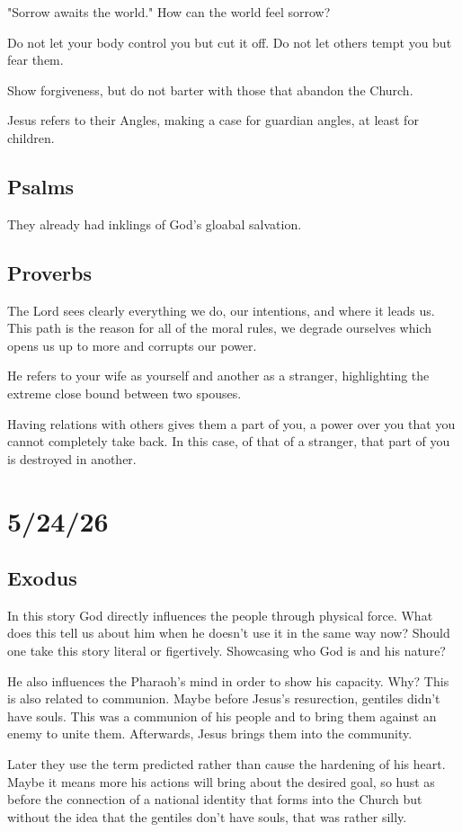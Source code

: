 "Sorrow awaits the world." How can the world feel sorrow?

Do not let your body control you but cut it off. Do not let others tempt you but fear them.

Show forgiveness, but do not barter with those that abandon the Church.

Jesus refers to their Angles, making a case for guardian angles, at least for children.
\subsection{Psalms}
They already had inklings of God's gloabal salvation.

\subsection{Proverbs}
The Lord sees clearly everything we do, our intentions, and where it leads us. This path is the reason for all of the moral rules, we degrade ourselves which opens us up to more and corrupts our power.

He refers to your wife as yourself and another as a stranger, highlighting the extreme close bound between two spouses.

Having relations with others gives them a part of you, a power over you that you cannot completely take back. In this case, of that of a stranger, that part of you is destroyed in another.
\section{5/24/26}
\subsection{Exodus}
In this story God directly influences the people through physical force. What does this tell us about him when he doesn't use it in the same way now? Should one take this story literal or figertively. Showcasing who God is and his nature?

He also influences the Pharaoh's mind in order to show his capacity. Why? This is also related to communion. Maybe before Jesus's resurection, gentiles didn't have souls. This was a communion of his people and to bring them against an enemy to unite them. Afterwards, Jesus brings them into the community.

Later they use the term predicted rather than cause the hardening of his heart. Maybe it means more his actions will bring about the desired goal, so hust as before the connection of a national identity that forms into the Church but without the idea that the gentiles don't have souls, that was rather silly.

